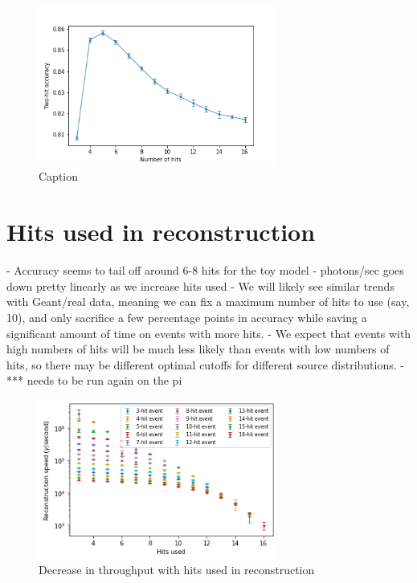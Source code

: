 \begin{figure}
    \centering
    \includegraphics[width=0.7\textwidth]{graphs/pi_hits_acc.png}
    \caption{Caption}
    \label{fig:my_label}
\end{figure}


\section{Hits used in reconstruction}
- Accuracy seems to tail off around 6-8 hits for the toy model
- photons/sec goes down pretty linearly as we increase hits used
- We will likely see similar trends with Geant/real data, meaning we can fix a maximum number of hits to use (say, 10), and only sacrifice a few percentage points in accuracy while saving a significant amount of time on events with more hits.
- We expect that events with high numbers of hits will be much less likely than events with low numbers of hits, so there may be different optimal cutoffs for different source distributions.
- *** needs to be run again on the pi

\begin{figure}
    \centering
    \includegraphics[width=0.7\textwidth]{graphs/pi_hits_v_hitsUsed_speed.png}
    \caption{Decrease in throughput with hits used in reconstruction}
    \label{fig:hits_v_hitsUsed}
\end{figure}


